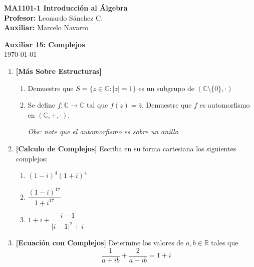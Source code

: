 \documentclass[letterpaper,10pt]{article}
\newcommand{\R}{\mathbb R}
\newcommand{\C}{\mathbb C}
\theoremstyle{plain}
\begin{document}
\noindent
\textbf{MA1101-1 Introducción al Álgebra}\\
\textbf{Profesor: }Leonardo Sánchez C.\\
\textbf{Auxiliar: }Marcelo Navarro

\begin{center}
{\bf \Large Auxiliar 15: Complejos}\\
{\today}
\end{center}

\begin{enumerate}[\bf P1.]
\item \textbf{[Más Sobre Estructuras]}
    \begin{enumerate}
        \item Demuestre que $S= \{z \in \C : |z|=1    \}$ es un subgrupo de $(\C \setminus \{0\}, \cdot)$
        \item Se define $f:\C \to \C$ tal que $f(z)=\overline{z}$. Demuestre que $f$ es automorfismo en $(\C,+,\cdot)$.
        
        \textit{Obs: note que el automorfismo es sobre un anillo}
    \end{enumerate}

\item \textbf{[Calculo de Complejos]} Escriba en su forma cartesiana los siguientes complejos:
    \begin{multicols}{3}
        \begin{enumerate}
            \item $(1-i)^4(1+i)^4$
            \item $\dfrac{(1-i)^{17}}{1+i^{17}}$
            \item $1+i+\dfrac{i-1}{|i-1|^2+i}$
        \end{enumerate}
    \end{multicols}

\item \textbf{[Ecuación con Complejos]} Determine los valores de $a,b \in \R$ tales que
$$ \dfrac{1}{a+ib}+\dfrac{2}{a-ib}=1+i $$


\end{enumerate}
\end{document}
